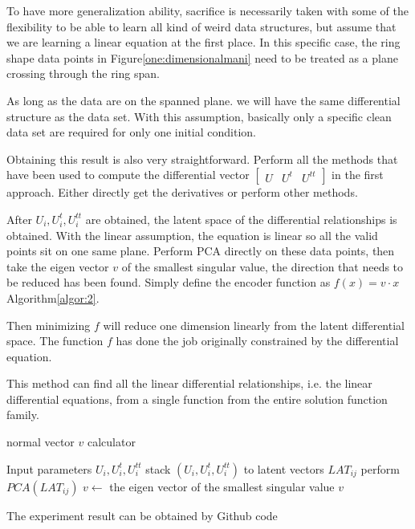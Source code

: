 \documentclass{article}
\begin{document}
To have more generalization ability, sacrifice
is necessarily taken with some of the flexibility
to be able to learn all kind of weird data structures,
but assume that we are learning a linear equation at the first place.
In this specific case, the ring shape data points in Figure\ref{one:dimensionalmani}
need to be treated as a plane crossing through the ring span.

As long as the data are on the spanned plane. we will have
the same differential structure as the data set.
With this assumption, basically only a specific clean data
set are required for only one initial condition.

Obtaining this result is also very straightforward.
Perform all the methods that have been used to compute the differential vector
$\left[\begin{matrix}{U}&{U^{t}}&{U^{tt}}\end{matrix}\right]$
in the first approach. Either directly get the derivatives or
perform other methods.

After $U_i, U^{t}_{i}, U^{tt}_{i}$ are obtained, the
latent space of the differential relationships is obtained.
With the linear assumption, the equation is linear so all the
valid points sit on one same plane. Perform PCA directly on
these data points, then take the eigen vector $v$ of the
smallest singular value, the direction that needs to be reduced
has been found. Simply define the encoder function as
$f(x)=v \cdot x$ Algorithm\ref{algor:2}.

Then minimizing $f$ will reduce one dimension linearly
from the latent differential space. The function $f$ has
done the job originally constrained by the differential equation.

This method can find all the linear differential relationships, i.e. the linear differential equations,
from a single function from the entire solution function family.
\begin{algorithm}
    \caption{normal vector $v$ calculator}\label{algor:2}
    \begin{algorithmic}[1]
        \REQUIRE Input parameters $U_i, U^{t}_{i}, U^{tt}_{i}$
        \STATE stack $(U_i,U^{t}_{i},U^{tt}_{i})$ to latent vectors $LAT_{ij}$
        \STATE perform $PCA(LAT_{ij})$
        \STATE $v \leftarrow$ the eigen vector of the smallest singular value
        \RETURN $v$
    \end{algorithmic}
\end{algorithm}

The experiment result can be obtained by Github
code \cite[deLinearTasksSine]{deLinearTasksSine}
\end{document}
